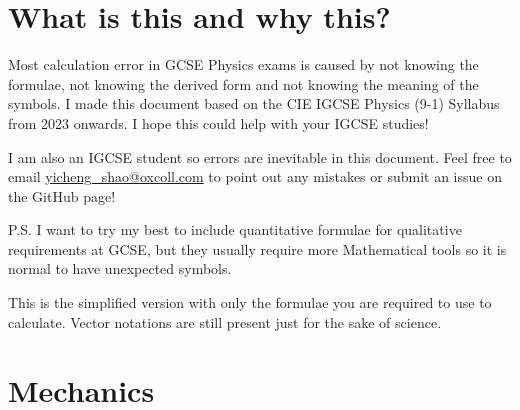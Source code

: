 \documentclass[8pt]{article}
\author{\Author}
\title{\Title}
\date{Version for In-School Distribution 1. \Date}
\begin{document}
	\maketitle

	\tableofcontents

    \section*{What is this and why this?}
        Most calculation error in GCSE Physics exams is caused by not knowing the formulae, not knowing the derived form and not knowing the meaning of the symbols. I made this document based on the CIE IGCSE Physics (9-1) Syllabus from 2023 onwards. I hope this could help with your IGCSE studies!

        I am also an IGCSE student so errors are inevitable in this document. Feel free to email \href{yicheng\_shao@oxcoll.com}{yicheng\_shao@oxcoll.com} to point out any mistakes or submit an issue on the GitHub page!

        P.S. I want to try my best to include quantitative formulae for qualitative requirements at GCSE, but they usually require more Mathematical tools so it is normal to have unexpected symbols.

        This is the simplified version with only the formulae you are required to use to calculate. Vector notations are still present just for the sake of science.

    \section{Mechanics}
\end{document}
